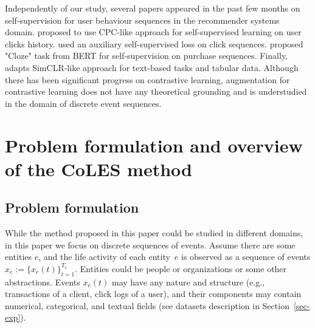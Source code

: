 \documentclass{article}
\newcommand{\R}{\mathbb{R}}
\begin{document}
Independently of our study, several papers appeared in the past few months on self-supervision for user behaviour sequences in the recommender systems domain. \cite{Zhou2020ContrastiveLF} proposed to use CPC-like approach for self-supervised learning on user clicks history. \cite{Ma2020DisentangledSI} used an auxiliary self-supervised loss on click sequences. \cite{Zhou2020S3RecSL} proposed "Cloze" task from BERT \citep{Devlin2019BERTPO} for self-supervision on purchase sequences. Finally, \cite{Yao2020SelfsupervisedLF} adapts SimCLR-like approach for text-based tasks and tabular data. Although there has been significant progress on contrastive learning, augmentation for contrastive learning does not have any theoretical grounding and is understudied in the domain of discrete event sequences.


\section{Problem formulation and overview of the CoLES method} \label{sec-method}

\subsection{Problem formulation} \label{sec:problem setting}

While the method proposed in this paper could be studied in different domains, in this paper we focus on discrete sequences of events. Assume there are some entities $e$, and the life activity of each entity~$e$ is observed as a sequence of events $x_e:=\{x_e(t)\}^{T_e}_{t=1}$. Entities could be people or organizations or some other abstractions. Events $x_e(t)$ may have any nature and structure (e.g., transactions of a client, click logs of a user), and their components may contain numerical, categorical, and textual fields (see datasets description in Section~\ref{sec-exp}). 
\end{document}
